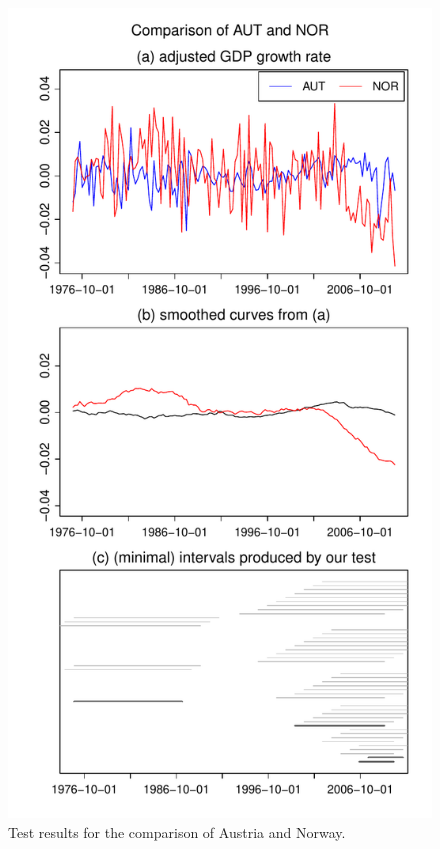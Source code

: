 \documentclass[a4paper,12pt]{article}
\begin{document}
\begin{figure}[p!]
\begin{minipage}[t]{0.49\textwidth}
\includegraphics[width=\textwidth]{Plots/AUT_vs_NOR}
\caption{Test results for the comparison of Austria and Norway.}\label{fig:Austria:Norway}
\end{minipage}
\hspace{0.25cm}

\end{figure}
\end{document}
